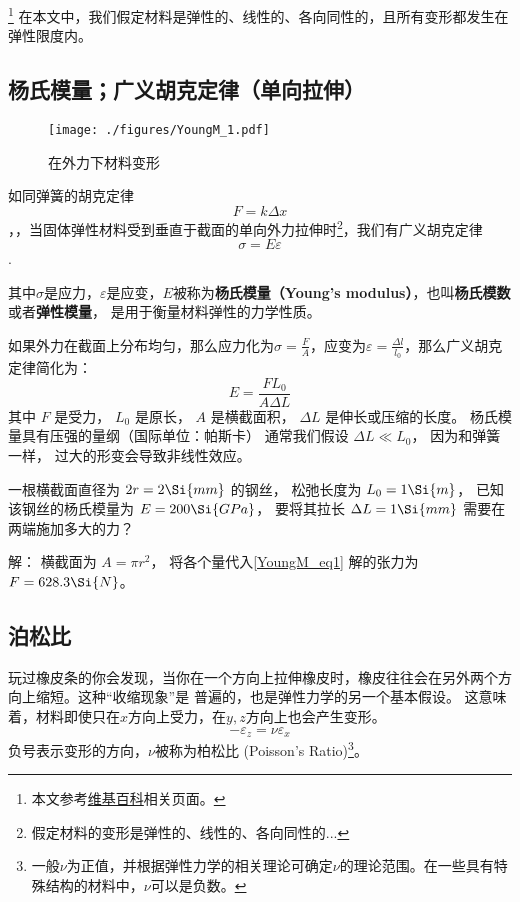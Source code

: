 
\begin{issues}
\issueDraft
\end{issues}

\footnote{本文参考\href{https://en.wikipedia.org/wiki/Young's_modulus}{维基百科}相关页面。}
在本文中，我们假定材料是弹性的、线性的、各向同性的，且所有变形都发生在弹性限度内。

\subsection{杨氏模量；广义胡克定律（单向拉伸）}
\begin{figure}[ht]
\centering
\texttt{[image: ./figures/YoungM\_1.pdf]}
\caption{在外力下材料变形} \label{YoungM_fig1}
\end{figure}

如同弹簧的胡克定律$$F=k \Delta x$$，，当固体弹性材料受到垂直于截面的单向外力拉伸时\footnote{假定材料的变形是弹性的、线性的、各向同性的...}，我们有广义胡克定律$$\sigma = E \varepsilon$$.

其中$\sigma$是应力，$\varepsilon$是应变，$E$被称为\textbf{杨氏模量（Young's modulus）}，也叫\textbf{杨氏模数}或者\textbf{弹性模量}， 是用于衡量材料弹性的力学性质。

如果外力在截面上分布均匀，那么应力化为$\sigma=\frac{F}{A}$，应变为$\varepsilon=\frac{\Delta l}{l_0}$，那么广义胡克定律简化为：
\begin{equation}\label{YoungM_eq1}
E = \frac{FL_0}{A\Delta L}
\end{equation}
其中 $F$ 是受力， $L_0$ 是原长， $A$ 是横截面积， $\Delta L$ 是伸长或压缩的长度。 杨氏模量具有压强的量纲（国际单位：帕斯卡）   通常我们假设 $\Delta L \ll L_0$， 因为和弹簧一样， 过大的形变会导致非线性效应。

\begin{example}{}
一根横截面直径为 $2r = 2\Si{mm}$ 的钢丝， 松弛长度为 $L_0 = 1\Si{m}$， 已知该钢丝的杨氏模量为 $E = 200\Si{GPa}$， 要将其拉长 $\Delta L = 1\Si{mm}$ 需要在两端施加多大的力？

解： 横截面为 $A = \pi r^2$， 将各个量代入\autoref{YoungM_eq1} 解的张力为 $F = 628.3\Si{N}$。
\end{example}

\subsection{泊松比}
玩过橡皮条的你会发现，当你在一个方向上拉伸橡皮时，橡皮往往会在另外两个方向上缩短。这种“收缩现象”是
普遍的，也是弹性力学的另一个基本假设。%
这意味着，材料即使只在$x$方向上受力，在$y,z$方向上也会产生变形。
$$-\varepsilon_z= \nu \varepsilon_x$$
负号表示变形的方向，$\nu$被称为柏松比 (Poisson's Ratio)\footnote{一般$\nu$为正值，并根据弹性力学的相关理论可确定$\nu$的理论范围。在一些具有特殊结构的材料中，$\nu$可以是负数。}。%

